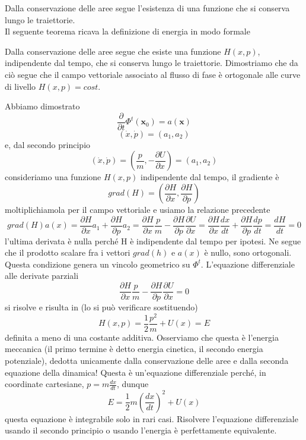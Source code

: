 \documentclass[
10pt, %
a4paper, %
oneside, %
headinclude,footinclude, %
BCOR5mm, %
]{scrartcl}
\begin{document}
	Dalla conservazione delle aree segue l'esistenza di una funzione che si conserva lungo le traiettorie.\\
	Il seguente teorema ricava la definizione di energia in modo formale
	\begin{teorema}
		Dalla conservazione delle aree segue che esiste una funzione \(H(x, p)\), indipendente dal tempo, che si conserva lungo le traiettorie. Dimostriamo che da ciò segue che il campo vettoriale associato al flusso di fase è ortogonale alle curve di livello \(H(x, p) = cost.\)
	\end{teorema}
	\begin{dimostrazione}
		Abbiamo dimostrato
		\[\frac{\partial}{\partial t}\Phi^t(\mathbf{x}_0) = a(\mathbf{x})\]
		\[(\dot{x}, \dot{p}) = (a_1, a_2)\]
		e, dal secondo principio
		\[(\dot{x}, \dot{p}) = \left(\frac{p}{m}, -\frac{\partial U}{\partial x}\right) =(a_1, a_2)\]
		consideriamo una funzione \(H(x, p)\) indipendente dal tempo, il gradiente è
		\[grad(H) = \left(\frac{\partial H}{\partial x}, \frac{\partial H}{\partial p} \right)\]
		moltiplichiamola per il campo vettoriale e usiamo la relazione precedente
		\[grad(H)a(x) = \frac{\partial H}{\partial x}a_1+ \frac{\partial H}{\partial p} a_2 = \frac{\partial H}{\partial x}\frac{p}{m}- \frac{\partial H}{\partial p} \frac{\partial U}{\partial x} =  \frac{\partial H}{\partial x}\frac{dx}{dt}+ \frac{\partial H}{\partial p} \frac{dp}{dt} = \frac{dH}{dt} = 0\]
		l'ultima derivata è nulla perché H è indipendente dal tempo per ipotesi. Ne segue che il prodotto scalare fra i vettori \(grad(h)\) e \(a(x)\) è nullo, sono ortogonali. Questa condizione genera un vincolo geometrico su \(\Phi^t\). L'equazione differenziale alle derivate parziali
		\[\frac{\partial H}{\partial x}\frac{p}{m}- \frac{\partial H}{\partial p} \frac{\partial U}{\partial x} = 0\]
		si risolve e risulta in (lo si può verificare sostituendo)
		\[H(x, p) = \frac{1}{2}\frac{p^2}{m}+U(x) = E\]
		definita a meno di una costante additiva. Osserviamo che questa è l'energia meccanica (il primo termine è detto energia cinetica, il secondo energia potenziale), dedotta unicamente dalla conservazione delle aree e dalla seconda equazione della dinamica!
		Questa è un'equazione differenziale perché, in coordinate cartesiane, \(p = m\frac{dx}{dt}\), dunque
		\[E = \frac{1}{2}m\left(\frac{dx}{dt}\right)^2+U(x)\]
		questa equazione è integrabile solo in rari casi. Risolvere l'equazione differenziale usando il secondo principio o usando l'energia è perfettamente equivalente.
	\end{dimostrazione}
\end{document}
